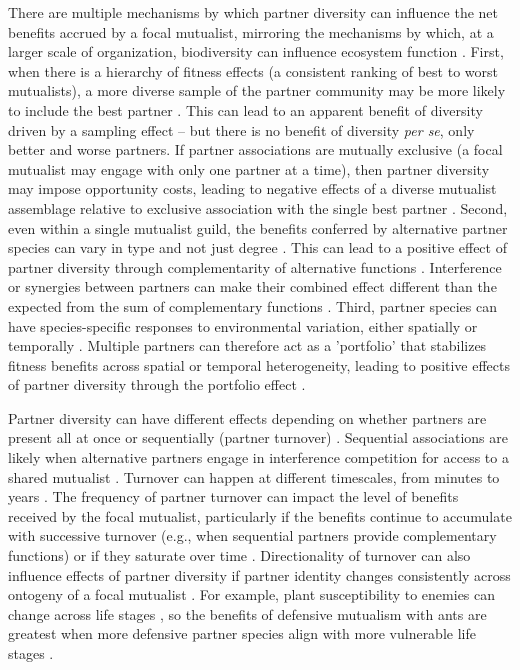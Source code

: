 \documentclass[11pt]{article}
\begin{document}
There are multiple mechanisms by which partner diversity can influence the net benefits accrued by a focal mutualist, mirroring the mechanisms by which, at a larger scale of organization, biodiversity can influence ecosystem function \cite{Yeung2006,Barrett2015,Ushio2020}. 
First, when there is a hierarchy of fitness effects (a consistent ranking of best to worst mutualists), a more diverse sample of the partner community may be more likely to include the best partner \cite{Frederickson2013}.
This can lead to an apparent benefit of diversity driven by a sampling effect \cite{Batstone2018} -- but there is no benefit of diversity \emph{per se}, only better and worse partners. 
If partner associations are mutually exclusive (a focal mutualist may engage with only one partner at a time), then partner diversity may impose opportunity costs, leading to negative effects of a diverse mutualist assemblage relative to exclusive association with the single best partner \citep{Miller2007}. 
Second, even within a single mutualist guild, the benefits conferred by alternative partner species can vary in type and not just degree \cite{Stachowicz2005,Bronstein2006,Stanton2003}. 
This can lead to a positive effect of partner diversity through complementarity of alternative functions \cite{Batstone2018}. 
Interference or synergies between partners can make their combined effect different than the expected from the sum of complementary functions \cite{Afkhami2014}. 
Third, partner species can have species-specific responses to environmental variation, either spatially \citep{Ollerton2006} or temporally \citep{Alarcon2008}. 
Multiple partners can therefore act as a 'portfolio' that stabilizes fitness benefits across spatial or temporal heterogeneity, leading to positive effects of partner diversity through the portfolio effect \cite{Batstone2018,Lazaro2022,Horvitz1990}. 

Partner diversity can have different effects depending on whether partners are present all at once or sequentially (partner turnover) \citep{Djieto-Lordon2005, Ness2006, Bruna2014,Barrett2015,Ushio2020,Dattilo2014}. 
Sequential associations are likely when alternative partners engage in interference competition for access to a shared mutualist \cite{Kiers2003,Batstone2018,Tgaard2015,Wulff2008}. 
Turnover can happen at different timescales, from minutes to years \citep{Oliveira1999,Horvitz1986}. 
The frequency of partner turnover can impact the level of benefits received by the focal mutualist, particularly if the benefits continue to accumulate with successive turnover (e.g., when sequential partners provide complementary functions) or if they saturate over time \citep{Sachs2004,Fiala1994}.
Directionality of turnover can also influence effects of partner diversity if partner identity changes consistently across ontogeny of a focal mutualist \citep{Fonseca2003,Noe1994,Dejean2008}.
For example, plant susceptibility to enemies can change across life stages \citep{Boege2005,Barton2010}, so the benefits of defensive mutualism with ants are greatest when more defensive partner species align with more vulnerable life stages \citep{Djieto-Lordon2005,Dejean2008}.
\end{document}
